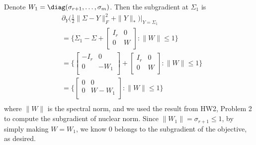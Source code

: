 Denote $W_1=\diag(\sigma_{r+1},\dots,\sigma_m)$.
Then the subgradient at $\Sigma_1$ is
\begin{equation}
\begin{split}
    & \partial_Y\bigg(\frac{1}{2}\|\Sigma-Y\|_F^2+\|Y\|_*\bigg)\bigg|_{Y=\Sigma_1} \\
    &= \bigg\{\Sigma_1 - \Sigma +
    \begin{bmatrix}
        I_r  & 0 \\
        0    & W \\
    \end{bmatrix}: \|W\|\le 1 \bigg\} \\
    &= \bigg\{\begin{bmatrix}
        -I_r  & 0 \\
        0    & -W_1 \\
    \end{bmatrix} +
    \begin{bmatrix}
        I_r  & 0 \\
        0    & W \\
    \end{bmatrix}: \|W\|\le 1 \bigg\} \\
    &= \bigg\{\begin{bmatrix}
        0    & 0 \\
        0    & W - W_1 \\
    \end{bmatrix}: \|W\|\le 1 \bigg\} \\
\end{split}
\end{equation}
where $\|W\|$ is the spectral norm,
and we used the result from HW2, Problem 2 to compute the subgradient
of nuclear norm.
Since $\|W_1\|=\sigma_{r+1}\le 1$,
by simply making $W=W_1$,
we know $0$ belongs to the subgradient of the objective,
as desired.
